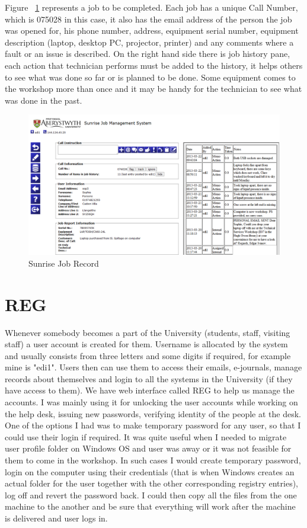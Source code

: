 \documentclass[10pt,a4paper,headinclude=true]{report}
\begin{document}
Figure ~\ref{fig:sunrise_job} represents a job to be completed. Each job has a unique Call Number, which is 075028 in this case, it also has the email address of the person the job was opened for, his phone number, address, equipment serial number, equipment description (laptop, desktop PC, projector, printer) and any comments where a fault or an issue is described. On the right hand side there is job history pane, each action that technician performs must be added to the history, it helps others to see what was done so far or is planned to be done. Some equipment comes to the workshop more than once and it may be handy for the technician to see what was done in the past.

\begin{figure}[H]
\centering
\centerline{\includegraphics[scale=0.5]{./sunrise_job}}
\caption{Sunrise Job Record}
\label{fig:sunrise_job}
\end{figure}

\section{REG}
Whenever somebody becomes a part of the University (students, staff, visiting staff) a user account is created for them. Username is allocated by the system and usually consists from three letters and some digits if required, for example mine is "edi1". Users then can use them to access their emails, e-journals, manage records about themselves and login to all the systems in the University (if they have access to them). We have web interface called REG to help us manage the accounts. I was mainly using it for unlocking the user accounts while working on the help desk, issuing new passwords, verifying identity of the people at the desk. One of the options I had was to make temporary password for any user, so that I could use their login if required. It was quite useful when I needed to migrate user profile folder on Windows OS and user was away or it was not feasible for them to come in the workshop. In such cases I would create temporary password, login on the computer using their credentials (that is when Windows creates an actual folder for the user together with the other corresponding registry entries), log off and revert the password back. I could then copy all the files from the one machine to the another and be sure that everything will work after the machine is delivered and user logs in.
\end{document}
